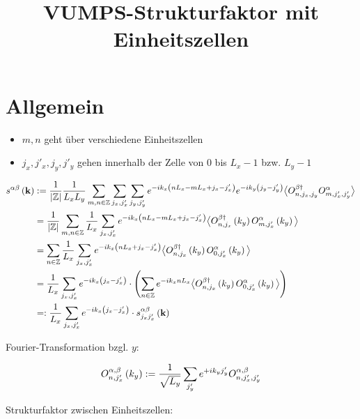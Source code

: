 \documentclass[12pt,paper=a4,BCOR=16mm]{article}
\title{VUMPS-Strukturfaktor mit Einheitszellen}
\begin{document}
\maketitle

\section{Allgemein}

\begin{itemize}
\item $m,n$ geht \"uber verschiedene Einheitszellen
\item $j_x,j'_x,j_y,j'_y$ gehen innerhalb der Zelle von $0$ bis $L_x-1$ bzw. $L_y-1$
\end{itemize}

\begin{equation}
\begin{split}
s^{\alpha\beta}\left(\mathbf{k}\right) &:=\frac{1}{\left|\mathbb{Z}\right|}  \frac{1}{L_xL_y} \sum_{m,n\in\mathbb{Z}} \sum_{j_x,j'_x} \sum_{j_y,j'_y} e^{-ik_x\left(nL_x-mL_x+j_x-j'_x\right)} e^{-ik_y\left(j_y-j'_y\right)} \big< O^{\beta\dagger}_{n,j_x,j_y} O^{\alpha}_{m,j'_x,j'_y} \big>\\
                      &= \frac{1}{\left|\mathbb{Z}\right|} \sum_{m,n\in\mathbb{Z}} \frac{1}{L_x} \sum_{j_x,j'_x} e^{-ik_x\left(nL_x-mL_x+j_x-j'_x\right)} \big< O^{\beta\dagger}_{n,j_x}\left(k_y\right) O^{\alpha}_{m,j'_x}\left(k_y\right) \big>\\
                      &= \sum_{n\in\mathbb{Z}} \frac{1}{L_x} \sum_{j_x,j'_x} e^{-ik_x\left(nL_x+j_x-j'_x\right)} \big< O^{\beta\dagger}_{n,j_x}\left(k_y\right) O^{\alpha}_{0,j'_x}\left(k_y\right) \big>\\
                      &= \frac{1}{L_x} \sum_{j_x,j'_x} e^{-ik_x\left(j_x-j'_x\right)} \cdot \left( \sum_{n\in\mathbb{Z}} e^{-ik_xnL_x} \big< O^{\beta\dagger}_{n,j_x}\left(k_y\right) O^{\alpha}_{0,j'_x}\left(k_y\right) \big> \right)\\
                      &=: \frac{1}{L_x} \sum_{j_x,j'_x} e^{-ik_x\left(j_x-j'_x\right)} \cdot s^{\alpha\beta}_{j_xj'_x}\left(\mathbf{k}\right)
\end{split}
\end{equation}

Fourier-Transformation bzgl. $y$:

\begin{equation}
O^{\alpha,\beta}_{n,j'_x}\left(k_y\right) := \frac{1}{\sqrt{L_y}} \sum_{j'_y} e^{+ik_yj'_y} O^{\alpha,\beta}_{n,j'_x,j'_y}
\end{equation}

Strukturfaktor zwischen Einheitszellen:
\end{document}
